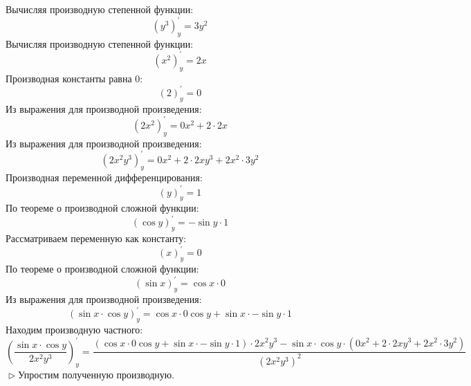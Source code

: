 \documentclass[12pt]{article}
\begin{document}
Вычисляя производную степенной функции:
\begin{dmath*}
\left(y^{3}\right)_{y}^{\prime} = 3y^{2}
\end{dmath*}Вычисляя производную степенной функции:
\begin{dmath*}
\left(x^{2}\right)_{y}^{\prime} = 2x
\end{dmath*}Производная константы равна 0:
\begin{dmath*}
\left(2\right)_{y}^{\prime} = 0
\end{dmath*}Из выражения для производной произведения:
\begin{dmath*}
\left(2x^{2}\right)_{y}^{\prime} = 0x^{2} + 2 \cdot 2x
\end{dmath*}Из выражения для производной произведения:
\begin{dmath*}
\left(2x^{2}y^{3}\right)_{y}^{\prime} = 0x^{2} + 2 \cdot 2xy^{3} + 2x^{2} \cdot 3y^{2}
\end{dmath*}Производная переменной дифференцирования:
\begin{dmath*}
\left(y\right)_{y}^{\prime} = 1
\end{dmath*}По теореме о производной сложной функции:
\begin{dmath*}
\left(\cos y\right)_{y}^{\prime} = -\sin y \cdot 1
\end{dmath*}Рассматриваем переменную как константу:
\begin{dmath*}
\left(x\right)_{y}^{\prime} = 0
\end{dmath*}По теореме о производной сложной функции:
\begin{dmath*}
\left(\sin x\right)_{y}^{\prime} = \cos x \cdot 0
\end{dmath*}Из выражения для производной произведения:
\begin{dmath*}
\left(\sin x \cdot \cos y\right)_{y}^{\prime} = \cos x \cdot 0\cos y + \sin x \cdot -\sin y \cdot 1
\end{dmath*}Находим производную частного:
\begin{dmath*}
\left( \frac {\sin x \cdot \cos y} {2x^{2}y^{3}} \right)_{y}^{\prime} =  \frac {\left(\cos x \cdot 0\cos y + \sin x \cdot -\sin y \cdot 1\right) \cdot 2x^{2}y^{3} - \sin x \cdot \cos y \cdot \left(0x^{2} + 2 \cdot 2xy^{3} + 2x^{2} \cdot 3y^{2}\right)} {\left(2x^{2}y^{3}\right)^{2}} 
\end{dmath*}$\vartriangleright$Упростим полученную производную.
\end{document}
